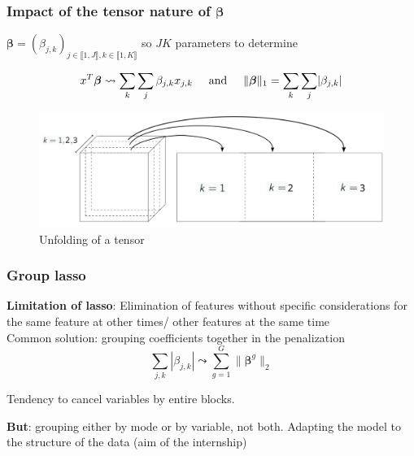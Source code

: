 \documentclass{beamer}
\begin{document}
\begin{frame}
    \frametitle{Impact of the tensor nature of $\bm{\beta}$}
    \begin{center}
    $\bm{\beta} = (\beta_{j,k})_{j \in \llbracket 1, J\rrbracket, k \in \llbracket 1, K\rrbracket}$ so $JK$ parameters to determine\\[15 pt]
    \end{center}
    $$x^T \bm{\beta} \leadsto \sum\limits_{k}\sum\limits_{j}  \beta_{j,k} x_{j,k} \hspace{0.5 cm} \text{and} \hspace{0.5 cm} \lVert \bm{\beta} \rVert_1 = \sum\limits_{k}\sum\limits_{j} \lvert \beta_{j,k} \rvert$$
    \begin{figure}
        \centering
        \includegraphics[scale = 0.2]{images/deplier.png}
        \caption{Unfolding of a tensor}
    \end{figure}

    
\end{frame}

\begin{frame}
    \frametitle{Group lasso}
 \textbf{Limitation of lasso}: Elimination of features without specific considerations for the same feature at other times/ other features at the same time\\[10 pt]

 Common solution: grouping coefficients together in the penalization
 $$ \sum\limits_{j,k} |\beta_{j,k}|\leadsto \sum\limits_{g = 1}^G \lVert \bm{\beta}^g \rVert_2 $$

 Tendency to cancel variables by entire blocks.

\textbf{But}: grouping either by mode or by variable, not both.  Adapting the model to the structure of the data (aim of the internship)
    

\end{frame}
\end{document}
